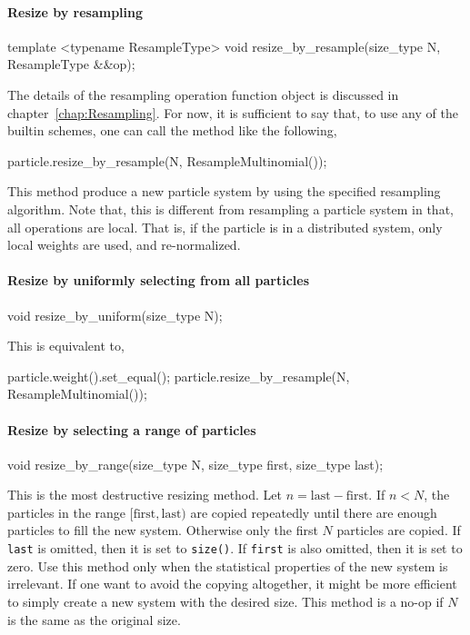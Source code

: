 \paragraph{Resize by resampling}

\begin{cppcode}
  template <typename ResampleType>
  void resize_by_resample(size_type N, ResampleType &&op);
\end{cppcode}
The details of the resampling operation function object is discussed in
chapter~\ref{chap:Resampling}. For now, it is sufficient to say that, to use
any of the builtin schemes, one can call the method like the following,
\begin{cppcode}
  particle.resize_by_resample(N, ResampleMultinomial());
\end{cppcode}
This method produce a new particle system by using the specified resampling
algorithm. Note that, this is different from resampling a particle system in
that, all operations are local. That is, if the particle is in a distributed
system, only local weights are used, and re-normalized.

\paragraph{Resize by uniformly selecting from all particles}

\begin{cppcode}
  void resize_by_uniform(size_type N);
\end{cppcode}
This is equivalent to,
\begin{cppcode}
  particle.weight().set_equal();
  particle.resize_by_resample(N, ResampleMultinomial());
\end{cppcode}

\paragraph{Resize by selecting a range of particles}

\begin{cppcode}
  void resize_by_range(size_type N, size_type first, size_type last);
\end{cppcode}
This is the most destructive resizing method. Let $n = \text{last} -
\text{first}$. If $n < N$, the particles in the range $[\text{first},
\text{last})$ are copied repeatedly until there are enough particles to fill
the new system. Otherwise only the first $N$ particles are copied. If
\verb|last| is omitted, then it is set to \verb|size()|. If \verb|first| is
also omitted, then it is set to zero. Use this method only when the statistical
properties of the new system is irrelevant. If one want to avoid the copying
altogether, it might be more efficient to simply create a new system with
the desired size. This method is a no-op if $N$ is the same as the original
size.


